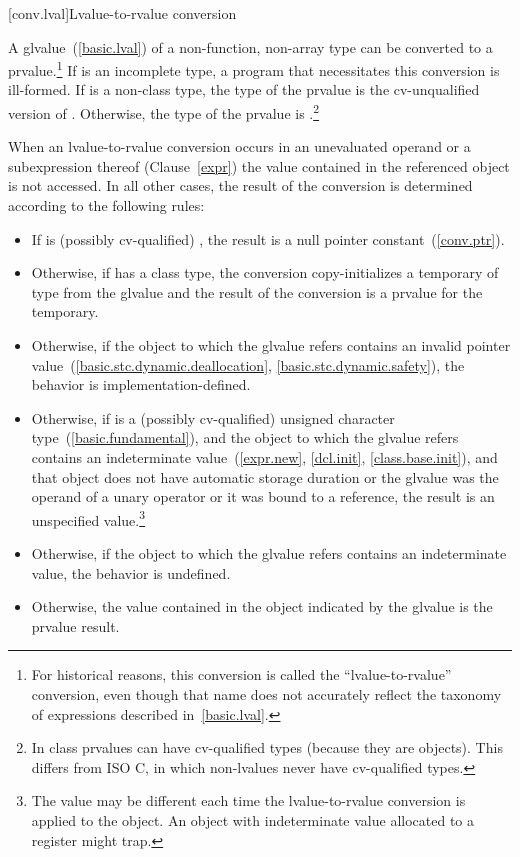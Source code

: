 [conv.lval]{Lvalue-to-rvalue conversion}

\pnum
{}%
%
A glvalue~(\ref{basic.lval}) of a non-function, non-array type 
can be converted to
a prvalue.\footnote{For historical reasons, this conversion is called the ``lvalue-to-rvalue''
conversion, even though that name does not accurately reflect the taxonomy
of expressions described in~\ref{basic.lval}.}
If  is an incomplete type, a
program that necessitates this conversion is ill-formed. If 
is a non-class type, the type of the prvalue is
the cv-unqualified version of . Otherwise, the type of the
prvalue is .\footnote{In \Cpp class prvalues can have cv-qualified types (because they are
objects). This differs from ISO C, in which non-lvalues never have
cv-qualified types.}

\pnum
When an lvalue-to-rvalue conversion occurs in an unevaluated operand or
a subexpression thereof (Clause~\ref{expr}) the value contained in the
referenced object is not accessed. In all other cases, the result of the conversion is determined according to the
following rules:

\begin{itemize}

\item If  is (possibly cv-qualified) , the result is a
null pointer constant~(\ref{conv.ptr}).

\item Otherwise, if  has a class
type, the conversion copy-initializes a temporary of type  from
the glvalue and the result of the conversion is a prvalue for the
temporary.

\item Otherwise, if the object to which the glvalue refers contains an invalid
pointer value~(\ref{basic.stc.dynamic.deallocation},
\ref{basic.stc.dynamic.safety}), the behavior is implementation-defined.

\item Otherwise, if  is a (possibly cv-qualified) unsigned character
type~(\ref{basic.fundamental}), and the object to which the glvalue refers
contains an indeterminate value~(\ref{expr.new}, \ref{dcl.init},
\ref{class.base.init}), and that object does not have automatic storage
duration or the glvalue was the operand of a unary \tcode{\&} operator or it
was bound to a reference, the result is an unspecified value.\footnote{The
value may be different each time the lvalue-to-rvalue conversion is applied to
the object. An  object with indeterminate value allocated
to a register might trap.}

\item Otherwise, if the object to which the glvalue refers contains an
indeterminate value, the behavior is undefined.

\item Otherwise, the value contained in the object indicated by the
glvalue is the prvalue result.

\end{itemize}

